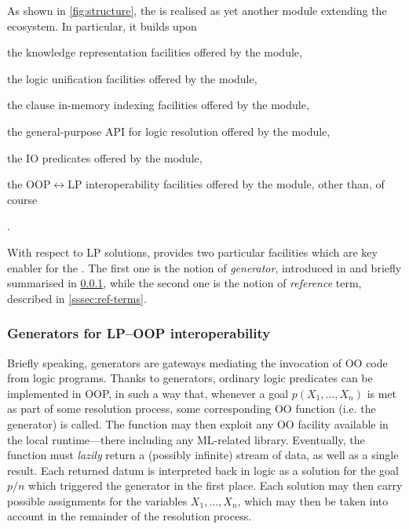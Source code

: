 \documentclass[12pt,a4paper,openright,twoside]{book}
\begin{document}
As shown in \cref{fig:structure}, the \mllib{} is realised as yet another module extending the \twopkt{} ecosystem.
%
In particular, it builds upon
%
\begin{inlinelist}
    \item the knowledge representation facilities offered by the  module,
    \item the logic unification facilities offered by the  module,
    \item the clause in-memory indexing facilities offered by the  module,
    \item the general-purpose API for logic resolution offered by the  module,
    \item the IO predicates offered by the  module,
    \item the OOP$\leftrightarrow$LP interoperability facilities offered by the  module, other than, of course
    \item \dlfj{}.
\end{inlinelist}

With respect to LP solutions, \twopkt{} provides two particular facilities which are key enabler for the \mllib{}.
%
The first one is the notion of \emph{generator}, introduced in \cite{2pkt-jelia2021} and briefly summarised in \cref{sssec:generators}, while the second one is the notion of \emph{reference} term, described in \cref{sssec:ref-terms}.

\subsubsection{Generators for LP--OOP interoperability}\label{sssec:generators}

Briefly speaking, generators are gateways mediating the invocation of OO code from logic programs.
%
Thanks to generators, ordinary logic predicates can be implemented in OOP, in such a way that, whenever a goal $p(X_1, \ldots, X_n)$ is met as part of some resolution process, some corresponding OO function (i.e. the generator) is called.
%
The function may then exploit any OO facility available in the local runtime---there including any ML-related library.
%
Eventually, the function must \emph{lazily} return a (possibly infinite) stream of data, as well as a single result.
%
Each returned datum is interpreted back in logic as a solution for the goal $p/n$ which triggered the generator in the first place.
%
Each solution may then carry possible assignments for the variables $X_1, \ldots, X_n$, which may then be taken into account in the remainder of the resolution process.
\end{document}
